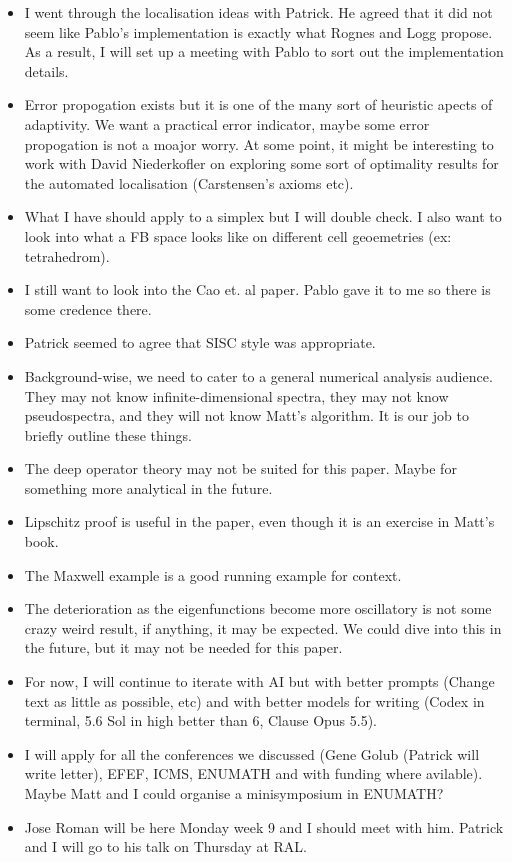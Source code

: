 \documentclass[12pt,a4paper]{article}
\begin{document}
\begin{itemize}
    \item I went through the localisation ideas with Patrick. He agreed that it did not seem like Pablo's implementation is exactly what Rognes and Logg propose. As a result, I will set up a meeting with Pablo to sort out the implementation details.
    \item Error propogation exists but it is one of the many sort of heuristic apects of adaptivity. We want a practical error indicator, maybe some error propogation is not a moajor worry. At some point, it might be interesting to work with David Niederkofler on exploring some sort of optimality results for the automated localisation (Carstensen's axioms etc). 
    \item What I have should apply to a simplex but I will double check. I also want to look into what a FB space looks like on different cell geoemetries (ex: tetrahedrom). 
    \item I still want to look into the Cao et. al paper. Pablo gave it to me so there is some credence there. 
    \item Patrick seemed to agree that SISC style was appropriate. 
    \item Background-wise, we need to cater to a general numerical analysis audience. They may not know infinite-dimensional spectra, they may not know pseudospectra, and they will not know Matt's algorithm. It is our job to briefly outline these things. 
    \item The deep operator theory may not be suited for this paper. Maybe for something more analytical in the future. 
    \item Lipschitz proof is useful in the paper, even though it is an exercise in Matt's book. 
    \item The Maxwell example is a good running example for context. 
    \item The deterioration as the eigenfunctions become more oscillatory is not some crazy weird result, if anything, it may be expected. We could dive into this in the future, but it may not be needed for this paper. 
    \item For now, I will continue to iterate with AI but with better prompts (Change text as little as possible, etc) and with better models for writing (Codex in terminal, 5.6 Sol in high better than 6, Clause Opus 5.5). 
    \item I will apply for all the conferences we discussed (Gene Golub (Patrick will write letter), EFEF, ICMS, ENUMATH and with funding where avilable). Maybe Matt and I could organise a minisymposium in ENUMATH? 
    \item Jose Roman will be here Monday week 9 and I should meet with him. Patrick and I will go to his talk on Thursday at RAL. 
\end{itemize}
\end{document}
